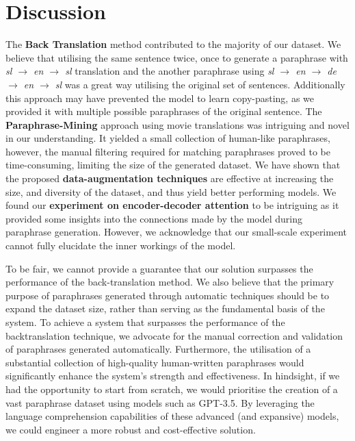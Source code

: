 \documentclass[fleqn,moreauthors,10pt]{ds_report}
\begin{document}

\section*{Discussion}


The \textbf{Back Translation} method contributed to the majority of our dataset. We believe that utilising the same sentence twice, once to generate a paraphrase with \textit{sl $\rightarrow$ en $\rightarrow$ sl}  translation and the another paraphrase using \textit{sl $\rightarrow$ en $\rightarrow$ de $\rightarrow$ en $\rightarrow$ sl}  was a great way utilising the original set of sentences. Additionally this approach may have prevented the model to learn copy-pasting, as we provided it with multiple possible paraphrases of the original sentence. The \textbf{Paraphrase-Mining} approach using movie translations was intriguing and novel in our understanding. It yielded a small collection of human-like paraphrases, however, the manual filtering required for matching paraphrases proved to be time-consuming, limiting the size of the generated dataset. We have shown that the proposed \textbf{data-augmentation techniques} are effective at increasing the size, and diversity of the dataset, and thus yield better performing models. We found our \textbf{experiment on encoder-decoder attention} to be intriguing as it provided some insights into the connections made by the model during paraphrase generation. However, we acknowledge that our small-scale experiment cannot fully elucidate the inner workings of the model. 

To be fair, we cannot provide a guarantee that our solution surpasses the performance of the back-translation method. We also believe that the primary purpose of paraphrases generated through automatic techniques should be to expand the dataset size, rather than serving as the fundamental basis of the system. To achieve a system that surpasses the performance of the backtranslation technique, we advocate for the manual correction and validation of paraphrases generated automatically. Furthermore, the utilisation of a substantial collection of high-quality human-written paraphrases would significantly enhance the system's strength and effectiveness. In hindsight, if we had the opportunity to start from scratch, we would prioritise the creation of a vast paraphrase dataset using models such as GPT-3.5. By leveraging the language comprehension capabilities of these advanced (and expansive) models, we could engineer a more robust and cost-effective solution.
\end{document}
